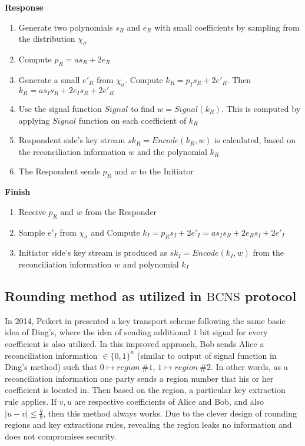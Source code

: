 \noindent\textbf{Response}
\begin{enumerate}
    \item Generate two polynomials $s_{R}$ and $e_{R}$ with small coefficients by sampling from the distribution $\chi _{\sigma }$
    \item Compute $p_{R}=as_{R}+2e_{R}$
    \item Generate a small $e'_{R}$ from $\chi _{\sigma }$. Compute $k_{R}=p_{I}s_{R}+2e'_{R}$. Then $k_{R}=as_{I}s_{R}+2e_{I}s_{R}+2e'_{R}$
    \item Use the signal function $Signal$ to find $w=Signal(k_{R})$. This is computed by applying $Signal$ function on each coefficient of $k_{R}$
    \item Respondent side's key stream $sk_{R}=Encode(k_{R}, w)$ is calculated, based on the reconciliation information $w$ and the polynomial $k_{R}$
    \item The Respondent sends $p_{R}$ and $w$ to the Initiator
\end{enumerate}

\noindent\textbf{Finish}
\begin{enumerate}
    \item Receive $p_{R}$ and $w$ from the Responder
    \item Sample $e'_{I}$ from $\chi _{\sigma }$ and Compute $k_{I}=p_{R}s_{I}+2e'_{I}=as_{I}s_{R}+2e_{R}s_{I}+2e'_{I}$
    \setcounter{enumi}{0}
    \item Initiator side's key stream is produced as $sk_{I}=Encode(k_{I}, w)$ from the reconciliation information $w$ and polynomial $k_I$
\end{enumerate}









\subsection{Rounding method as utilized in $\mathrm{BCNS}$ protocol}
In 2014, Peikert in \cite{peikert2014lattice} presented a key transport scheme following the same basic idea of Ding's, where the idea of sending additional $1$ bit signal for every coefficient is also utilized. In this improved approach, Bob sends Alice a reconciliation information $\in \{0,1\}^n$ (similar to output of signal function in Ding's method) such that $0 \mapsto region\ \#1$, $1 \mapsto region\ \#2$. In other words, as a reconciliation information one party sends a region number that his or her coefficient is located in. Then based on the region, a particular key extraction rule applies. If $v, u$ are respective coefficients of Alice and Bob, and also $|u-v| \le \frac{q}{8}$, then this method always works. Due to the clever design of rounding regions and key extractions rules, revealing the region leaks no information and does not compromises security.

